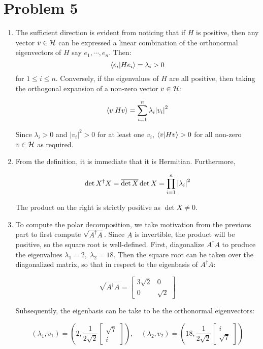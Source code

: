 \documentclass[12pt]{article}%
\begin{document}
\section{Problem 5}
\begin{enumerate}
  \item The sufficient direction is evident from noticing that if $H$ is positive, then any vector $v \in \mathcal{H}$ can be expressed a linear combination of the orthonormal eigenvectors of $H$ say $e_1,\cdots,e_n$. Then:
  $$ \ip{e_i}{He_i} = \lambda_{i} > 0$$ for $1 \leq i \leq n$. Conversely, if the eigenvalues of $H$ are all positive, then taking the orthogonal expansion of a non-zero vector $v \in \mathcal{H}$:

  \[ \ip{v}{Hv} = \sum_{i = 1}^n \lambda_{i} \abs{v_i}^2 \]

  Since $\lambda_i > 0$ and $|v_i|^2 > 0$ for at least one $v_i$, $ \ip{v}{Hv} > 0$ for all non-zero $v \in \mathcal{H}$ as required.

  \item From the definition, it is immediate that it is Hermitian. Furthermore,

  \[ \det X^\dagger X = \overline{\det X }\det X = \prod_{i =1}^n \abs{\lambda_i}^2 \]

  The product on the right is strictly positive as $\det{X} \neq 0$.

  \item
  To compute the polar decomposition, we take motivation from the previous part to first compute $\sqrt{A^\dagger A}$. Since $A$ is invertible, the product will be positive, so the square root is well-defined. First, diagonalize $A^\dagger A$ to produce the eigenvalues $\lambda_1 = 2, \; \lambda_2 = 18$. Then the square root can be taken over the diagonalized matrix, so that in respect to the eigenbasis of $A^\dagger A$:

  \[ \sqrt{A^\dagger A} = \begin{bmatrix}
    3 \sqrt{2} & 0 \\ 0 & \sqrt{2}
  \end{bmatrix} \]

  Subsequently, the eigenbasis can be take to be the orthonormal eigenvectors:

  \[ (\lambda_1, v_1) = (2, \frac{1}{2\sqrt{2}} \begin{bmatrix}
     \sqrt{7} \\ i
  \end{bmatrix}), \quad (\lambda_2, v_2) = (18, \frac{1}{2\sqrt{2}}\begin{bmatrix}
      i \\ \sqrt{7}
  \end{bmatrix}) \]


\end{enumerate}
\end{document}

